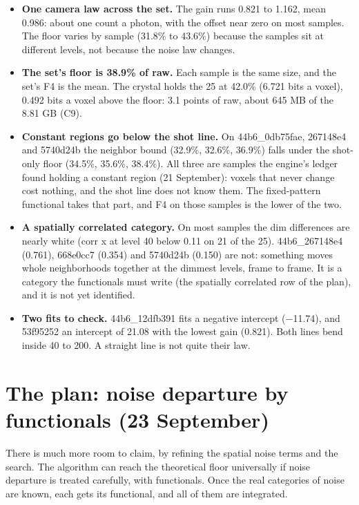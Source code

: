 \begin{itemize}
\item \textbf{One camera law across the set.} The gain runs 0.821 to 1.162, mean 0.986: about one count a photon, with the offset near zero on most samples. The floor varies by sample (31.8\% to 43.6\%) because the samples sit at different levels, not because the noise law changes.
\item \textbf{The set's floor is 38.9\% of raw.} Each sample is the same size, and the set's F4 is the mean. The crystal holds the 25 at 42.0\% (6.721 bits a voxel), 0.492 bits a voxel above the floor: 3.1 points of raw, about 645 MB of the 8.81 GB (C9).
\item \textbf{Constant regions go below the shot line.} On 44b6\_\allowbreak{}0db75fae, 267148e4 and 5740d24b the neighbor bound (32.9\%, 32.6\%, 36.9\%) falls under the shot-only floor (34.5\%, 35.6\%, 38.4\%). All three are samples the engine's ledger found holding a constant region (21 September): voxels that never change cost nothing, and the shot line does not know them. The fixed-pattern functional takes that part, and F4 on those samples is the lower of the two.
\item \textbf{A spatially correlated category.} On most samples the dim differences are nearly white (corr x at level 40 below 0.11 on 21 of the 25). 44b6\_\allowbreak{}267148e4 (0.761), 668e0cc7 (0.354) and 5740d24b (0.150) are not: something moves whole neighborhoods together at the dimmest levels, frame to frame. It is a category the functionals must write (the spatially correlated row of the plan), and it is not yet identified.
\item \textbf{Two fits to check.} 44b6\_\allowbreak{}12dfb391 fits a negative intercept (−11.74), and 53f95252 an intercept of 21.08 with the lowest gain (0.821). Both lines bend inside 40 to 200. A straight line is not quite their law.
\end{itemize}

\section{\texorpdfstring{The plan: noise departure by functionals (23 September)}{The plan: noise departure by functionals (23 September)}}

There is much more room to claim, by refining the spatial noise terms and the search. The algorithm can reach the theoretical floor universally if noise departure is treated carefully, with functionals. Once the real categories of noise are known, each gets its functional, and all of them are integrated.

